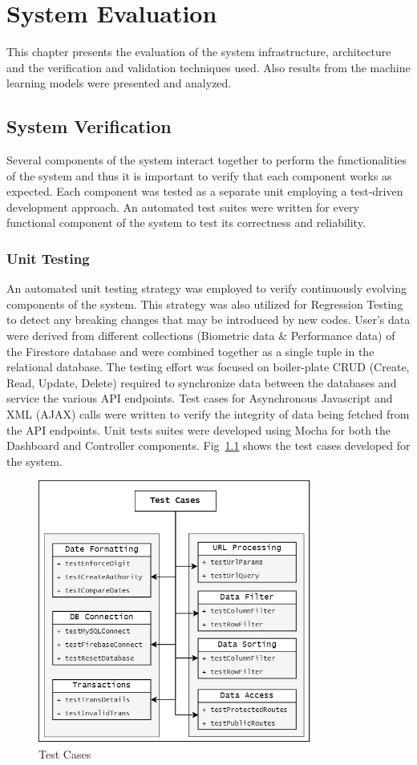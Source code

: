 \chapter{System Evaluation}
This chapter presents the evaluation of the system infrastructure, architecture and the verification and validation techniques used. Also results from the machine 
learning models were presented and analyzed. 


\section{System Verification}
Several components of the system interact together to perform the functionalities of the system and thus it is important to verify that each component works as 
expected. Each component was tested as a separate unit employing a test-driven development approach. An automated test suites were written for every functional component
of the system to test its correctness and reliability.
\subsection{Unit Testing}
An automated unit testing strategy was employed to verify continuously evolving components of the system. This strategy was also utilized for Regression Testing
to detect any breaking changes that may be introduced by new codes.
User's data were derived from different collections (Biometric data \& Performance data) of the Firestore database and were combined together as a single tuple in the 
relational database.  The testing effort was focused on boiler-plate CRUD (Create, Read, Update, Delete) required to synchronize data between the databases and service 
the various API endpoints. Test cases for Asynchronous Javascript and XML (AJAX) calls were written to verify the integrity of data being fetched from the API endpoints. 
Unit tests suites were developed using Mocha for both the Dashboard and Controller components. Fig~\ref{image:test_cases} shows the test cases developed for the 
system. 

\begin{figure}[H]
    \centering
    \includegraphics[width=0.8\textwidth]{images/test_cases.png}
    \caption{Test Cases}
    \label{image:test_cases}
\end{figure}

